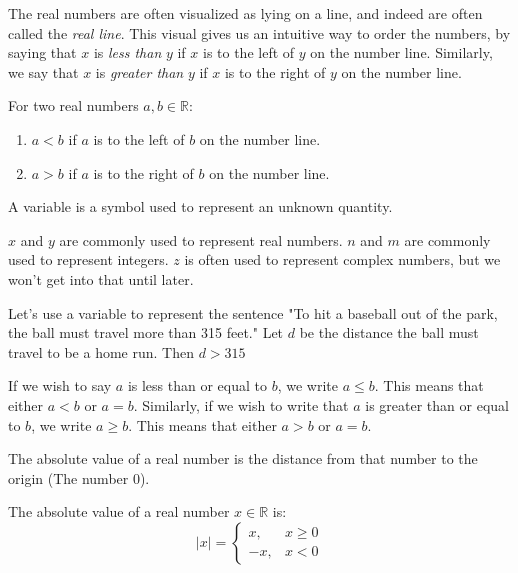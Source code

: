 \documentclass[crop=false,class=book,oneside]{standalone}
\begin{document}
        The real numbers are often visualized as lying on a
        line, and indeed are often called the \textit{real line}.
        This visual gives us an intuitive way to order the numbers,
        by saying that $x$ is \textit{less than} $y$ if $x$ is
        to the left of $y$ on the number line. Similarly, we say
        that $x$ is \textit{greater than} $y$ if $x$ is to the
        right of $y$ on the number line.
        \begin{properties}
            For two real numbers $a,b\in \mathbb{R}$:
            \begin{enumerate}
                \item $a<b$ if $a$ is to the left of $b$ on the number line.
                \item $a>b$ if $a$ is to the right of $b$ on the number line.
            \end{enumerate}
        \end{properties}
        \begin{definition}
        A variable is a symbol used to represent an unknown quantity.
        \end{definition}
        \begin{example}
        $x$ and $y$ are commonly used to represent real numbers. $n$ and $m$ are commonly used to represent integers. $z$ is often used to represent complex numbers, but we won't get into that until later.
        \end{example}
        \begin{example}
        Let's use a variable to represent the sentence "To hit a baseball out of the park, the ball must travel more than 315 feet." Let $d$ be the distance the ball must travel to be a home run. Then $d>315$
        \end{example}
        \begin{notation}
        If we wish to say $a$ is less than or equal to $b$, we write $a\leq b$. This means that either $a<b$ or $a=b$. Similarly, if we wish to write that $a$ is greater than or equal to $b$, we write $a\geq b$. This means that either $a>b$ or $a=b$.
        \end{notation}
        The absolute value of a real number is the distance from that number to the origin (The number $0$).
        \begin{definition}
            The absolute value of a real number
            $x\in \mathbb{R}$ is:
            \begin{equation}
                |x|=
                \begin{cases}
                    x,&x\geq{0}\\
                    \minus{x},&x<0
                \end{cases}
            \end{equation}
        \end{definition}
\end{document}
